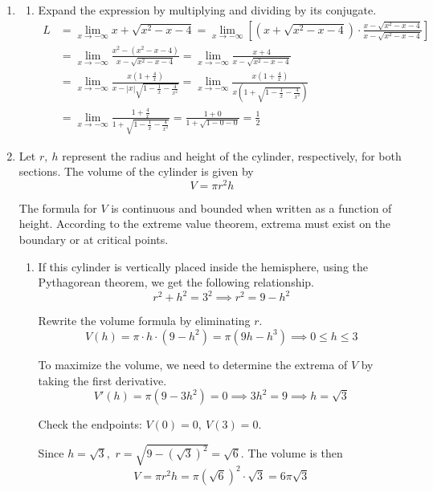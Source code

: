 \documentclass[a4paper, 12pt]{article}
\begin{document}
\begin{enumerate}[leftmargin=*,label=\textbf{\arabic*.}]
\begin{enumerate}[leftmargin=*,label=\textbf{\arabic*.}]
\item \begin{enumerate}[leftmargin=*,label=\textbf{\alph*.}]
\item Expand the expression by multiplying and dividing by its conjugate.
\begin{align*}L&=\lim_{x\to-\infty}x+\sqrt{x^2-x-4}=\lim_{x\to-\infty}\left[\left(x+\sqrt{x^2-x-4}\right)\cdot\frac{x-\sqrt{x^2-x-4}}{x-\sqrt{x^2-x-4}}\right]\\[1em]&=\lim_{x\to-\infty}\frac{x^2-\left(x^2-x-4\right)}{x-\sqrt{x^2-x-4}}=\lim_{x\to-\infty}\frac{x+4}{x-\sqrt{x^2-x-4}}\\[1em]&=\lim_{x\to-\infty}\frac{x\left(1+\frac4x\right)}{x-\left|x\right|\sqrt{1-\frac1x-\frac4{x^2}}}=\lim_{x\to-\infty}\frac{x\left(1+\frac4x\right)}{x\left(1+\sqrt{1-\frac1x-\frac4{x^2}}\right)}\\[1em]&=\lim_{x\to-\infty}\frac{1+\frac4x}{1+\sqrt{1-\frac1x-\frac4{x^2}}}=\frac{1+0}{1+\sqrt{1-0-0}}=\boxed{\frac12}\end{align*}
\end{enumerate}

\item Let $r,\:h$ represent the radius and height of the cylinder, respectively, for both sections. The volume of the cylinder is given by
\[V=\pi r^2h\]

The formula for $V$ is continuous and bounded when written as a function of height. According to the extreme value theorem, extrema must exist on the boundary or at critical points.

\begin{enumerate}[leftmargin=*,label=\textbf{\alph*.}]
\item If this cylinder is vertically placed inside the hemisphere, using the Pythagorean theorem, we get the following relationship.
\[r^2+h^2=3^2\implies r^2=9-h^2\]

Rewrite the volume formula by eliminating $r$.
\[V(h)=\pi\cdot h\cdot(9-h^2)=\pi\left(9h-h^3\right)\implies 0\leq h\leq3\]

To maximize the volume, we need to determine the extrema of $V$ by taking the first derivative.
\[V'(h)=\pi\left(9-3h^2\right)=0\implies 3h^2=9\implies h=\sqrt3\]

Check the endpoints: $V(0)=0,\: V(3)=0$.

Since $h=\sqrt3,$ $r=\sqrt{9-\left(\sqrt3\right)^2}=\sqrt6$. The volume is then
\[V=\pi r^2 h=\pi\left(\sqrt6\right)^2\cdot\sqrt3=\boxed{6\pi\sqrt3}\]


\end{enumerate}
\end{enumerate}
\end{enumerate}
\end{document}
